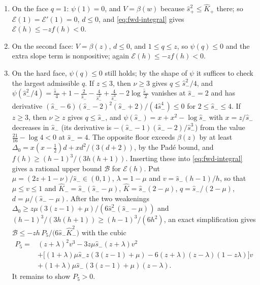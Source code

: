 \begin{enumerate}
\item On the face $q=1$: $\psi(1)=0$, and $V=\beta(w)$ because $\hat s_+^2\le\hat K_+$ there; so
  $\mathcal E(1)=\mathcal E'(1)=0$, $d\le0$, and \eqref{eq:fwd-integral} gives
  $\mathcal E(h)\le-zf(h)<0$.
\item On the second face: $V=\beta(z)$, $d\le0$, and $1\le q\le z$, so $\psi(q)\le0$ and the extra
  slope term is nonpositive; again $\mathcal E(h)\le-zf(h)<0$.
\item On the hard face, $\psi(q)\le0$ still holds; by the shape of $\psi$ it suffices to check the
  largest admissible $q$. If $z\le3$, then $\nu\ge3$ gives $q\le\hat s_-^2/4$, and
  $\psi(\hat s_-^2/4)=\frac{\hat s_-}4+1-\frac2{\hat s_-}-\frac4{\hat s_-^2}+\frac4{\hat s_-^3}
  -2\log\frac{\hat s_-}2$ vanishes at $\hat s_-=2$ and has derivative
  $(\hat s_--6)(\hat s_--2)^2(\hat s_-+2)/(4\hat s_-^4)\le0$ for $2\le\hat s_-\le4$. If $z\ge3$, then
  $\nu\ge z$ gives $q\le\hat s_-$, and $\psi(\hat s_-)=x+x^2-\log\hat s_-$ with $x=z/\hat s_-$
  decreases in $\hat s_-$ (its derivative is $-(\hat s_--1)(\hat s_--2)/\hat s_-^3$) from the value
  $\frac{21}{16}-\log4<0$ at $\hat s_-=4$.
  The opposite floor exceeds $\beta(z)$ by at least $\Delta_0=x(x-\frac12)d+xd^2/(3(d+2))$, by the
  Pad\'e bound, and $f(h)\ge(h-1)^3/(3h(h+1))$. Inserting these into \eqref{eq:fwd-integral} gives
  a rational upper bound $\mathcal B$ for $\mathcal E(h)$. Put $\mu=(2z+1-\nu)/\hat s_-\in(0,1)$,
  $\lambda=1-\mu$ and $v=\hat s_-(h-1)/h$, so that $\mu\le v\le1$ and
  $\hat K_-=\hat s_-(\hat s_--\mu)$, $\hat K=\hat s_-(2-\mu)$, $q=\hat s_-/(2-\mu)$,
  $d=\mu/(\hat s_--\mu)$. After the two weakenings
  $\Delta_0\ge z\mu(3(z-1)+\mu)/(6\hat s_-^2(\hat s_--\mu))$ and
  $(h-1)^3/(3h(h+1))\ge(h-1)^3/(6h^2)$, an exact simplification gives
  $\mathcal B\le-zh\,P_5/\bigl(6\hat s_-\hat K_-^2\bigr)$ with the cubic
  \begin{align*}
  P_5={}&(z+\lambda)^2v^3-3z\mu\hat s_-(z+\lambda)v^2\\
   &+\bigl[(1+\lambda)\mu\hat s_-z(3(z-1)+\mu)-6(z+\lambda)(z-\lambda)(1-z\lambda)\bigr]v\\
   &+(1+\lambda)\mu\hat s_-(3(z-1)+\mu)(z-\lambda).
  \end{align*}
  It remains to show $P_5>0$.
\end{enumerate}

